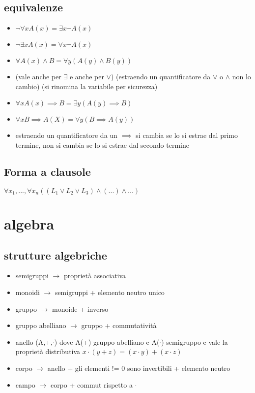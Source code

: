 \documentclass{article}
\begin{document}
\begin{multicols*}{3}
 		\subsection{equivalenze}
 		\begin{itemize}
 			\setlength\itemsep{0.1mm}
 			\item \(\neg \forall x A(x) = \exists x\neg A(x)\)
 			\item \(\neg \exists x A(x) = \forall x\neg A(x)\)
 			\item \(\forall A(x) \land B = \forall y (A(y) \land B(y))\) 
 			\item (vale anche per \(\exists\) e anche per \(\lor\)) (estraendo un quantificatore da \(\lor\) o \(\land\) non lo cambio) (si rinomina la variabile per sicurezza)
 			\item \(\forall x A(x) \implies B = \exists y (A(y) \implies B)\)
 			\item \(\forall x B \implies A(X) = \forall y (B \implies A(y))\) 
 			\item estraendo un quantificatore da un \(\implies\) si cambia se lo si estrae dal primo termine, non si cambia se lo si estrae dal secondo termine
 		\end{itemize}
 		\subsection{Forma a clausole}
 		\(\forall x_1,..., \forall x_n ((L_1\lor L_2 \lor L_3)\land (...) \land  ...)\)
 		\section{algebra}
 		\subsection{strutture algebriche}
 		\begin{itemize}
 			\setlength\itemsep{0.1mm}
 			\item semigruppi \(\rightarrow\) proprietà associativa
 			\item monoidi \(\rightarrow\) semigruppi + elemento neutro unico
 			\item gruppo \(\rightarrow\) monoide + inverso
 			\item gruppo abelliano \(\rightarrow\) gruppo + commutatività
 			\item anello (A,+,\(\cdot\)) dove A(+) gruppo abelliano e A(\(\cdot\)) semigruppo e vale la proprietà distributiva \(x\cdot(y+z) = (x\cdot y )+(x\cdot z)\)
 			\item corpo \(\rightarrow\) anello + gli elementi != 0 sono invertibili + elemento neutro
 			\item campo \(\rightarrow\) corpo + commut rispetto a \(\cdot\)
 		\end{itemize}

\end{multicols*}
\end{document}
